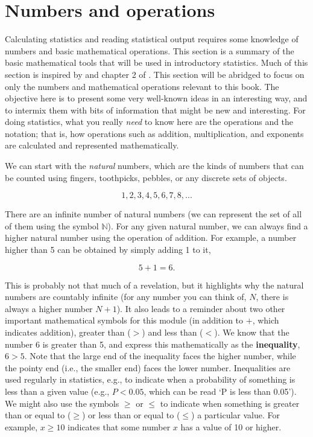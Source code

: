 \documentclass[
]{scrbook}
\begin{document}
\hypertarget{numbers-and-operations}{%
\section{Numbers and operations}\label{numbers-and-operations}}

Calculating statistics and reading statistical output requires some knowledge of numbers and basic mathematical operations.
This section is a summary of the basic mathematical tools that will be used in introductory statistics.
Much of this section is inspired by \citet{Courant1996} and chapter 2 of \citet{Pastor2008}.
This section will be abridged to focus on only the numbers and mathematical operations relevant to this book.
The objective here is to present some very well-known ideas in an interesting way, and to intermix them with bits of information that might be new and interesting.
For doing statistics, what you really \emph{need} to know here are the operations and the notation; that is, how operations such as addition, multiplication, and exponents are calculated and represented mathematically.

We can start with the \emph{natural} numbers, which are the kinds of numbers that can be counted using fingers, toothpicks, pebbles, or any discrete sets of objects.

\[1, 2, 3, 4, 5, 6, 7, 8, ...\]

There are an infinite number of natural numbers (we can represent the set of all of them using the symbol \(\mathbb{N}\)).
For any given natural number, we can always find a higher natural number using the operation of addition.
For example, a number higher than 5 can be obtained by simply adding 1 to it,

\[5 + 1 = 6.\]

This is probably not that much of a revelation, but it highlights why the natural numbers are countably infinite (for any number you can think of, \(N\), there is always a higher number \(N + 1\)).
It also leads to a reminder about two other important mathematical symbols for this module (in addition to \(+\), which indicates addition), greater than (\(>\)) and less than (\(<\)).
We know that the number 6 is greater than 5, and express this mathematically as the \textbf{inequality}, \(6 > 5\).
Note that the large end of the inequality faces the higher number, while the pointy end (i.e., the smaller end) faces the lower number.
Inequalities are used regularly in statistics, e.g., to indicate when a probability of something is less than a given value (e.g., \(P < 0.05\), which can be read `P is less than 0.05').
We might also use the symbols \(\geq\) or \(\leq\) to indicate when something is greater than or equal to (\(\geq\)) or less than or equal to (\(\leq\)) a particular value.
For example, \(x \geq 10\) indicates that some number \(x\) has a value of 10 or higher.
\end{document}
